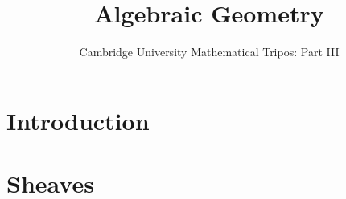 \documentclass{article}
\title{Algebraic Geometry}
\author{Cambridge University Mathematical Tripos: Part III}
\begin{document}
\maketitle

\tableofcontentsnewpage{}


\section{Introduction}

\section{Sheaves}

\end{document}
